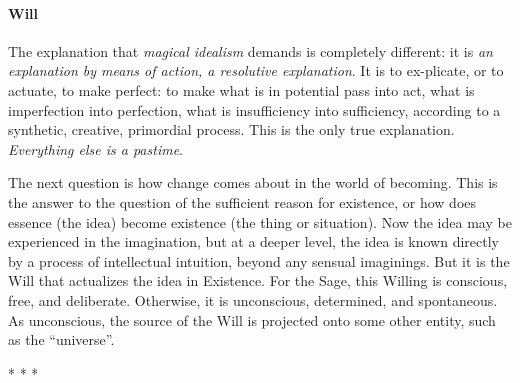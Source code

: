 \paragraph{Will}
\begin{quotex}
The explanation that \emph{magical idealism} demands is completely different: it is \emph{an explanation by means of action, a resolutive explanation}. It is to ex-plicate, or to actuate, to make perfect: to make what is in potential pass into act, what is imperfection into perfection, what is insufficiency into sufficiency, according to a synthetic, creative, primordial process. This is the only true explanation. \emph{Everything else is a pastime}. 

\end{quotex}
The next question is how change comes about in the world of becoming. This is the answer to the question of the sufficient reason for existence, or how does essence (the idea) become existence (the thing or situation). Now the idea may be experienced in the imagination, but at a deeper level, the idea is known directly by a process of intellectual intuition, beyond any sensual imaginings. But it is the Will that actualizes the idea in Existence. For the Sage, this Willing is conscious, free, and deliberate. Otherwise, it is unconscious, determined, and spontaneous. As unconscious, the source of the Will is projected onto some other entity, such as the “universe”.




\begin{center}* * *\end{center}

